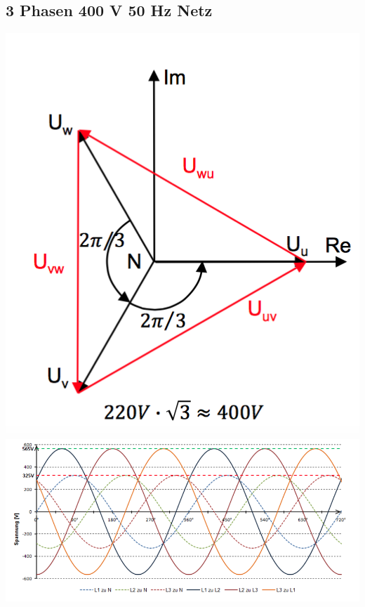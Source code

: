 \subsection{3 Phasen 400 V 50 Hz Netz}
\begin{minipage}{0.4 \linewidth}
\includegraphics[width = 0.8 \linewidth]{./Pics/VL89/Drehstrom}
\includegraphics[width = \linewidth]{./Pics/VL89/Drehstrom2}
\end{minipage}
